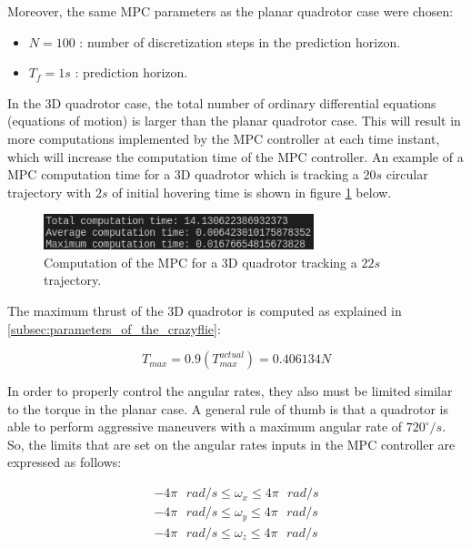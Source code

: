 \documentclass{thesisreport}
\begin{document}
Moreover, the same MPC parameters as the planar quadrotor case were chosen:
\begin{itemize}
	\item $N = 100$ : number of discretization steps in the prediction horizon.
	\item $T_f = 1s$ : prediction horizon.
\end{itemize}

In the 3D quadrotor case, the total number of ordinary differential equations (equations of motion) is larger than the planar quadrotor case. This will result in more computations implemented by the MPC controller at each time instant, which will increase the computation time of the MPC controller. An example of a MPC computation time for a 3D quadrotor which is tracking a $20s$ circular trajectory with $2s$ of initial hovering time is shown in figure \ref{fig:computation_time_3D_quadrotor} below.

\begin{figure}[h]
	\centering
	\includegraphics[width=0.7\textwidth]{Images/acados_simulations/circular_trajectory/3D_quadrotor/computation_time.png}
	\caption{Computation of the MPC for a 3D quadrotor tracking a $22s$ trajectory.}
	\label{fig:computation_time_3D_quadrotor}
\end{figure}

The maximum thrust of the 3D quadrotor is computed as explained in \ref{subsec:parameters_of_the_crazyflie}: 

	\begin{equation}
		T_{max} = 0.9 (T_{max}^{actual})=0.406134N
	\end{equation}

In order to properly control the angular rates, they also must be limited similar to the torque in the planar case. A general rule of thumb is that a quadrotor is able to perform aggressive maneuvers with a maximum angular rate of $720^{\circ}/s$. So, the limits that are set on the angular rates inputs in the MPC controller are expressed as follows:

		\begin{align}
			-4 \pi \text{ }rad/s \leq \omega_x \leq 4 \pi \text{ } rad/s \\
			-4 \pi \text{ }rad/s \leq \omega_y \leq 4 \pi \text{ } rad/s \\
			-4 \pi \text{ }rad/s \leq \omega_z \leq 4 \pi \text{ } rad/s
		\end{align}
\end{document}
